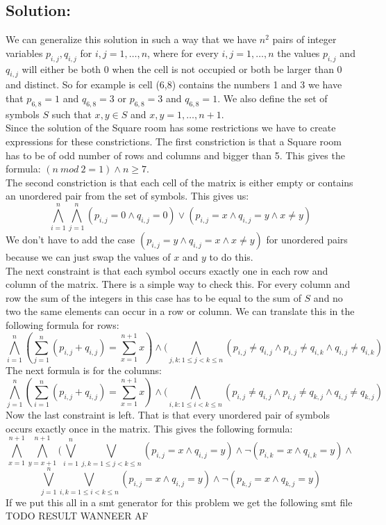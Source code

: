 \documentclass[12pt]{article}
\begin{document}
\subsection*{Solution:}
We can generalize this solution in such a way that we have $n^2$ pairs of integer variables $p_{i,j}, q_{i,j}$ for $i,j = 1, \ldots, n$, where for every $i,j = 1, \ldots, n$ the values $p_{i,j}$ and $q_{i,j}$ will either be both 0 when the cell is not occupied or both be larger than 0 and distinct. So for example is cell (6,8) contains the numbers 1 and 3 we have that $p_{6,8} = 1$ and  $q_{6,8} = 3$ or  $p_{6,8} = 3$ and  $q_{6,8} = 1$. We also define the set of symbols $S$ such that $x,y \in S$ and $x,y = 1, \ldots, n+1$.\\
Since the solution of the Square room has some restrictions we have to create expressions for these constrictions. The first constriction is that a Square room has to be of odd number of rows and columns and bigger than 5. This gives the formula: $(n \ mod \ 2 = 1) \wedge n \geq 7$.\\
The second constriction is that each cell of the matrix is either empty or contains an unordered pair from the set of symbols. This gives us:
\[\bigwedge_{i=1}^{n} \bigwedge_{j=1}^{n} (p_{i,j} = 0 \wedge q_{i,j} = 0) \vee (p_{i,j} = x \wedge q_{i,j} = y \wedge x \neq y)\]
We don't have to add the case $(p_{i,j} = y \wedge q_{i,j} = x \wedge x \neq y)$ for unordered pairs because we can just swap the values of $x$ and $y$ to do this.\\
The next constraint is that each symbol occurs exactly one in each row and column of the matrix. There is a simple way to check this. For every column and row the sum of the integers in this case has to be equal to the sum of $S$ and no two the same elements can occur in a row or column. We can translate this in the following formula for rows:
\[\bigwedge_{i=1}^{n} (\sum_{j=1}^{n} (p_{i,j} + q_{i,j}) = \sum_{x=1}^{n+1} x) \wedge (\bigwedge_{j,k: 1\leq j < k \leq n} (p_{i,j} \neq q_{i,j} \wedge p_{i,j} \neq q_{i,k} \wedge q_{i,j} \neq q_{i,k})\]
The next formula is for the columns:
\[\bigwedge_{j=1}^{n} (\sum_{i=1}^{n} (p_{i,j} + q_{i,j}) = \sum_{x=1}^{n+1} x) \wedge (\bigwedge_{i,k: 1\leq i < k \leq n} (p_{i,j} \neq q_{i,j} \wedge p_{i,j} \neq q_{k,j} \wedge q_{i,j} \neq q_{k,j})\]
Now the last constraint is left. That is that every unordered pair of symbols occurs exactly once in the matrix. This gives the following formula:
\[\bigwedge_{x=1}^{n+1} \bigwedge_{y=x+1}^{n+1} ( \bigvee_{i=1}^{n} \bigvee_{j,k = 1 \leq j < k \leq n} (p_{i,j} = x \wedge q_{i,j} = y) \wedge \neg (p_{i,k} = x \wedge q_{i,k} = y)  \wedge \]
\[ \bigvee_{j=1}^{n} \bigvee_{i,k = 1 \leq i < k \leq n} (p_{i,j} = x \wedge q_{i,j} = y) \wedge \neg (p_{k,j} = x \wedge q_{k,j} = y) \]
If we put this all in a smt generator for this problem we get the following smt file
TODO RESULT WANNEER AF
\end{document}
